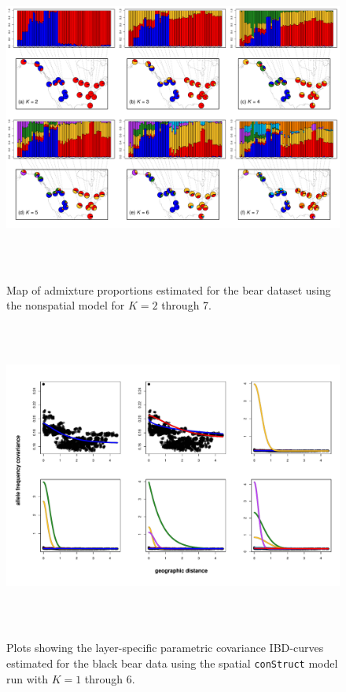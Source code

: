\documentclass[10pt,letterpaper]{article}
\begin{document}
\begin{figure}
	\centering
		{\includegraphics[width=6in,height=4in]{figs/bears/bear_nsp_results.pdf}}
	\caption{
	Map of admixture proportions estimated for the bear dataset 
	using the nonspatial model for $K=2$ through 7.
    }\label{bear_nsp_pies}
\end{figure}

\begin{figure}
	\centering
		{\includegraphics[width=6in,height=4in]{figs/bears/bear_sp_layer_covs.pdf}}
	\caption{
	Plots showing the layer-specific parametric covariance IBD-curves 
	estimated for the black bear data using 
	the spatial \texttt{conStruct} model run with $K=1$ through 6.
	 }\label{bear_sp_layer_covs}
\end{figure}
\end{document}
